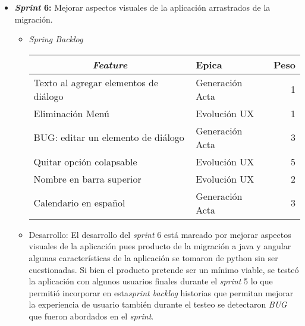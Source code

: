 \begin{itemize}
\begin{itemize}
\item \textit{Spring Review}: Durante la \textit{review} de este \textit{sprint} se presentó los componentes desplegados en Heroku que soportan los microservicios que fueron configurados dentro de un pipeline\footnote{Definición y uso de pipeline en: \url{https://jenkins.io/doc/book/pipeline/}} de java y la visualización gráfica de las minutas de un proyecto (ver figuras: C7 y C8).

\begin{figure}[!h]
\centering
\texttt{[image: /demo5-1]}
\label{imga-c51}
\caption{Visualizar detalle acta D-Minute, elaboración propia}
\end{figure}

\begin{figure}[!h]
\centering
\texttt{[image: /demo5-2]}
\label{imga-c52}
\caption{Pipeline arquitectura de microservicios D-Minute, elaboración propia}
\end{figure}

\end{itemize}


	\item \textbf{\textit{Sprint} 6:} Mejorar aspectos visuales de la aplicación arrastrados de la migración. 
	
\begin{itemize}
\item \textit{Spring Backlog}

\begin{table}[!h]
\centering
\label{tab:backlog6}
\begin{tabular}{|l|l|r|}
\hline
\multicolumn{1}{|c|}{\textit{\textbf{Feature}}} & \textbf{Epica} & \textbf{Peso} \\ \hline
Texto al agregar elementos de diálogo & Generación Acta & 1 \\ \hline
Eliminación Menú & Evolución UX & 1 \\ \hline
BUG: editar un elemento de diálogo & Generación Acta & 3 \\ \hline
Quitar opción colapsable & Evolución UX & 5 \\ \hline
Nombre en barra superior & Evolución UX & 2 \\ \hline
Calendario en español & Generación Acta & 3 \\ \hline
\end{tabular}
\end{table}

\item Desarrollo: El desarrollo del \textit{sprint} 6 está marcado por mejorar aspectos visuales de la aplicación pues producto de la migración a java y angular algunas características de la aplicación se tomaron de python sin ser cuestionadas. Si bien el producto pretende ser un mínimo viable, se testeó la aplicación con algunos usuarios finales durante el \textit{sprint} 5 lo que permitió incorporar en esta\textit{sprint backlog} historias que permitan mejorar la experiencia de usuario también durante el testeo se detectaron \textit{BUG} que fueron abordados en el \textit{sprint}.


\end{itemize}
\end{itemize}
